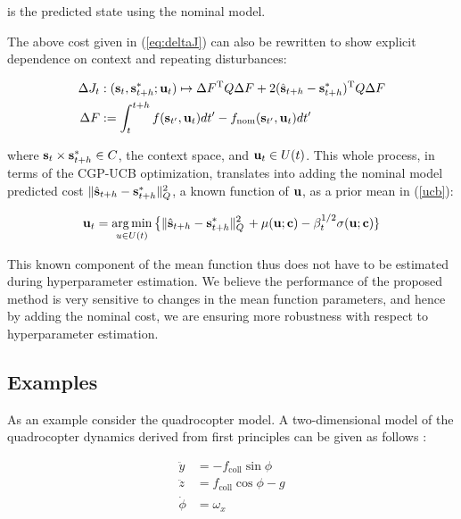 is the predicted state using the nominal model.

The above cost given in (\ref{eq:deltaJ}) can also be rewritten to show explicit dependence on context and repeating disturbances:

\begin{align}
\Delta J_{t} &: (\mathbf{s}_t, \mathbf{s}^{*}_{t+h}; \mathbf{u}_t) \mapsto \Delta F^{\mathrm{T}} Q \Delta F + 2(\hat{\mathbf{s}}_{t+h} - \mathbf{s}^{*}_{t+h})^{\mathrm{T}} Q \Delta F \label{delta_cost} \\
\Delta F &:= \int_{t}^{t+h}f(\mathbf{s}_{t'},\mathbf{u}_t)dt' - f_{\mathrm{nom}}(\mathbf{s}_{t'},\mathbf{u}_t)dt' \label{delta_f} 
\end{align}

where $\mathbf{s}_t \times \mathbf{s}^{*}_{t+h} \in C$, the context space, and $\mathbf{u}_t \in U(t)$. This whole process, in terms of the CGP-UCB optimization, translates into adding the nominal model predicted cost $\|\hat{\mathbf{s}}_{t+h} - \mathbf{s}^{\mathrm{*}}_{t+h}\|_{Q}^{2}$, a known function of $\mathbf{u}$, as a prior mean in (\ref{ucb}):

\begin{equation}
\mathbf{u}_{t} = \operatorname*{arg\,min}_{u \in U(t)} \left\lbrace  \|\hat{\mathbf{s}}_{t+h} - \mathbf{s}^{*}_{t+h}\|_{Q}^{2} \right. 		+ \mu(\mathbf{u};\mathbf{c}) - \beta_t^{1/2}\sigma(\mathbf{u};\mathbf{c}) \rbrace \label{boostedUCB}
\end{equation}

This known component of the mean function thus does not have to be estimated during hyperparameter estimation. We believe the performance of the proposed method is very sensitive to changes in the mean function parameters, and hence by adding the nominal cost, we are ensuring more robustness with respect to hyperparameter estimation. 

\subsection{Examples}
\label{examples}
As an example consider the quadrocopter model. A two-dimensional model of the quadrocopter dynamics derived from first principles can be given as follows \cite{ILC_Angela}:

\begin{equation}
\begin{aligned}
\ddot{y} &= -f_{\mathrm{coll}} \sin\phi \\
\ddot{z} &=  f_{\mathrm{coll}}\cos\phi - g \\
\dot{\phi} &= \omega_{x}
\end{aligned}
\label{quadrocopterDynamics}
\end{equation}

